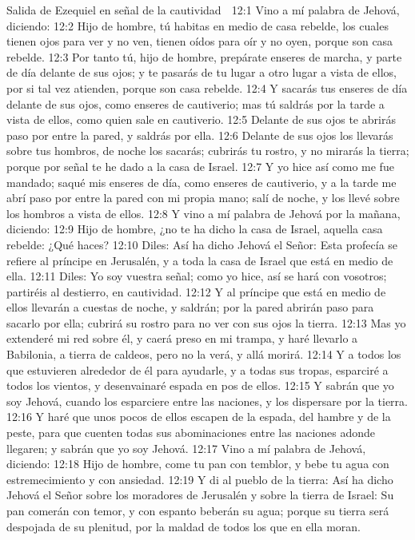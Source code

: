 Salida de Ezequiel en señal de la cautividad  

12:1 Vino a mí palabra de Jehová, diciendo:  
12:2 Hijo de hombre, tú habitas en medio de casa rebelde, los cuales tienen ojos para ver y no ven, tienen oídos para oír y no oyen,  porque son casa rebelde.  
12:3 Por tanto tú, hijo de hombre, prepárate enseres de marcha, y parte de día delante de sus ojos; y te pasarás de tu lugar a otro lugar a vista de ellos, por si tal vez atienden, porque son casa rebelde.  
12:4 Y sacarás tus enseres de día delante de sus ojos, como enseres de cautiverio; mas tú saldrás por la tarde a vista de ellos, como quien sale en cautiverio.  
12:5 Delante de sus ojos te abrirás paso por entre la pared, y saldrás por ella.  
12:6 Delante de sus ojos los llevarás sobre tus hombros, de noche los sacarás; cubrirás tu rostro, y no mirarás la tierra; porque por señal te he dado a la casa de Israel.  
12:7 Y yo hice así como me fue mandado; saqué mis enseres de día, como enseres de cautiverio, y a la tarde me abrí paso por entre la pared con mi propia mano; salí de noche, y los llevé sobre los hombros a vista de ellos.  
12:8 Y vino a mí palabra de Jehová por la mañana, diciendo:  
12:9 Hijo de hombre, ¿no te ha dicho la casa de Israel, aquella casa rebelde: ¿Qué haces?  
12:10 Diles: Así ha dicho Jehová el Señor: Esta profecía se refiere al príncipe en Jerusalén, y a toda la casa de Israel que está en medio de ella.  
12:11 Diles: Yo soy vuestra señal; como yo hice, así se hará con vosotros; partiréis al destierro, en cautividad. 
12:12 Y al príncipe que está en medio de ellos llevarán a cuestas de noche, y saldrán; por la pared abrirán paso para sacarlo por ella; cubrirá su rostro para no ver con sus ojos la tierra.  
12:13 Mas yo extenderé mi red sobre él, y caerá preso en mi trampa, y haré llevarlo a Babilonia, a tierra de caldeos, pero no la verá, y allá morirá.  
12:14 Y a todos los que estuvieren alrededor de él para ayudarle, y a todas sus tropas, esparciré a todos los vientos, y desenvainaré espada en pos de ellos. 
12:15 Y sabrán que yo soy Jehová, cuando los esparciere entre las naciones, y los dispersare por la tierra.  
12:16 Y haré que unos pocos de ellos escapen de la espada, del hambre y de la peste, para que cuenten todas sus abominaciones entre las naciones adonde llegaren; y sabrán que yo soy Jehová.  
12:17 Vino a mí palabra de Jehová, diciendo:  
12:18 Hijo de hombre, come tu pan con temblor, y bebe tu agua con estremecimiento y con ansiedad. 
12:19 Y di al pueblo de la tierra: Así ha dicho Jehová el Señor sobre los moradores de Jerusalén y sobre la tierra de Israel: Su pan comerán con temor, y con espanto beberán su agua; porque su tierra será despojada de su plenitud, por la maldad de todos los que en ella moran.  
